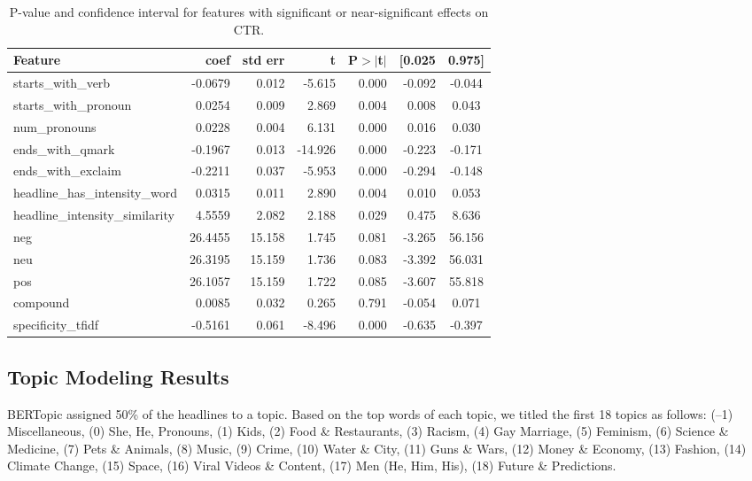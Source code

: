 \documentclass[11pt]{article}
\begin{document}
\begin{table}[t!]
\centering
\small
\begin{tabular}{lrrrrrc}
\toprule
Feature & coef & std err & t & P$>|$t$|$ & [0.025 & 0.975] \\
\midrule
starts\_with\_verb & -0.0679 & 0.012 & -5.615 & 0.000 & -0.092 & -0.044 \\
starts\_with\_pronoun & 0.0254 & 0.009 & 2.869 & 0.004 & 0.008 & 0.043 \\
num\_pronouns & 0.0228 & 0.004 & 6.131 & 0.000 & 0.016 & 0.030 \\
ends\_with\_qmark & -0.1967 & 0.013 & -14.926 & 0.000 & -0.223 & -0.171 \\
ends\_with\_exclaim & -0.2211 & 0.037 & -5.953 & 0.000 & -0.294 & -0.148 \\
headline\_has\_intensity\_word & 0.0315 & 0.011 & 2.890 & 0.004 & 0.010 & 0.053 \\
headline\_intensity\_similarity & 4.5559 & 2.082 & 2.188 & 0.029 & 0.475 & 8.636 \\
neg & 26.4455 & 15.158 & 1.745 & 0.081 & -3.265 & 56.156 \\
neu & 26.3195 & 15.159 & 1.736 & 0.083 & -3.392 & 56.031 \\
pos & 26.1057 & 15.159 & 1.722 & 0.085 & -3.607 & 55.818 \\
compound & 0.0085 & 0.032 & 0.265 & 0.791 & -0.054 & 0.071 \\
specificity\_tfidf & -0.5161 & 0.061 & -8.496 & 0.000 & -0.635 & -0.397 \\
\bottomrule
\end{tabular}
\caption{P-value and confidence interval for features with significant or near-significant effects on CTR.}
\label{tab:feature-impact}
\end{table}


\subsection{Topic Modeling Results}

BERTopic assigned 50\% of the headlines to a topic. Based on the top words of each topic, we titled the first 18 topics as follows: (--1) Miscellaneous, (0) She, He, Pronouns, (1) Kids, (2) Food \& Restaurants, (3) Racism, (4) Gay Marriage, (5) Feminism, (6) Science \& Medicine, (7) Pets \& Animals, (8) Music, (9) Crime, (10) Water \& City, (11) Guns \& Wars, (12) Money \& Economy, (13) Fashion, (14) Climate Change, (15) Space, (16) Viral Videos \& Content, (17) Men (He, Him, His), (18) Future \& Predictions.
\end{document}
